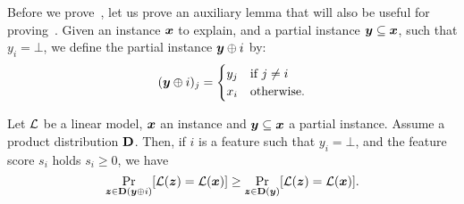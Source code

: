     Before we prove~, let us prove an auxiliary lemma that will also be useful for proving~.
Given an instance ${\bm{x}}$ to explain, and a partial instance ${\bm{y}} \subseteq {\bm{x}}$, such that $y_i = \bot$, we define the partial instance ${\bm{y}} \oplus i$ by:
\[ 
    ({\bm{y}} \oplus i)_j = \begin{cases}
        y_j & \text{if } j \neq i\\
        x_i & \text{otherwise}.
    \end{cases}
\]
\begin{lemma}\label{lemma:positive-score}
Let $\mathcal{L}$ be a linear model, ${\bm{x}}$ an instance and ${\bm{y}} \subseteq {\bm{x}}$ a partial instance. Assume a product distribution $\mathbf{D}$. Then, if $i$ is a feature such that $y_i = \bot$, and the feature score $s_i$ holds $s_i \geq 0$, we have 
\[ 
\Pr_{{\bm{z}} \in \mathbf{D}({\bm{y}} \oplus i)}[\mathcal{L}({\bm{z}}) = \mathcal{L}({\bm{x}})] \geq \Pr_{{\bm{z}} \in \mathbf{D}({\bm{y}})}[\mathcal{L}({\bm{z}}) = \mathcal{L}({\bm{x}})].
\]
\end{lemma}
